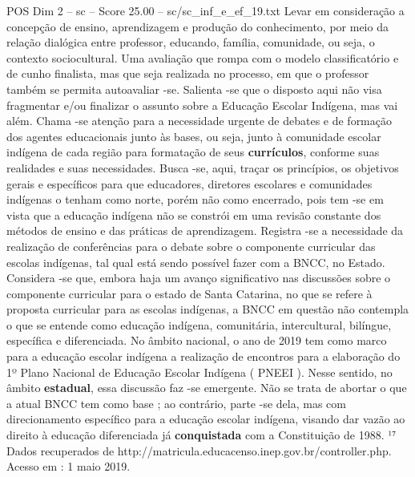 \begin{textsample}{POS Dim 2 – sc – Score 25.00 – sc/sc\_inf\_e\_ef\_19.txt}
Levar em consideração a concepção de ensino, aprendizagem e produção do conhecimento, por meio da relação dialógica entre professor, educando, família, comunidade, ou seja, o contexto sociocultural.
Uma avaliação que rompa com o modelo classificatório e de cunho finalista, mas que seja realizada no processo, em que o professor também se permita autoavaliar -se.
Salienta -se que o disposto aqui não visa fragmentar e/ou finalizar o assunto sobre a Educação Escolar Indígena, mas vai além.
Chama -se atenção para a necessidade urgente de debates e de formação dos agentes educacionais junto às bases, ou seja, junto à comunidade escolar indígena de cada região para formatação de seus \textbf{currículos}, conforme suas realidades e suas necessidades.
Busca -se, aqui, traçar os princípios, os objetivos gerais e específicos para que educadores, diretores escolares e comunidades indígenas o tenham como norte, porém não como encerrado, pois tem -se em vista que a educação indígena não se constrói em uma revisão constante dos métodos de ensino e das práticas de aprendizagem.
Registra -se a necessidade da realização de conferências para o debate sobre o componente curricular das escolas indígenas, tal qual está sendo possível fazer com a BNCC, no Estado.
Considera -se que, embora haja um avanço significativo nas discussões sobre o componente curricular para o estado de Santa Catarina, no que se refere à proposta curricular para as escolas indígenas, a BNCC em questão não contempla o que se entende como educação indígena, comunitária, intercultural, bilíngue, específica e diferenciada.
No âmbito nacional, o ano de 2019 tem como marco para a educação escolar indígena a realização de encontros para a elaboração do 1º Plano Nacional de Educação Escolar Indígena ( PNEEI ).
Nesse sentido, no âmbito \textbf{estadual}, essa discussão faz -se emergente.
Não se trata de abortar o que a atual BNCC tem como base ; ao contrário, parte -se dela, mas com direcionamento específico para a educação escolar indígena, visando dar vazão ao direito à educação diferenciada já \textbf{conquistada} com a Constituição de 1988. ¹⁷ Dados recuperados de http://matricula.educacenso.inep.gov.br/controller.php.
Acesso em : 1 maio 2019.

\end{textsample}
